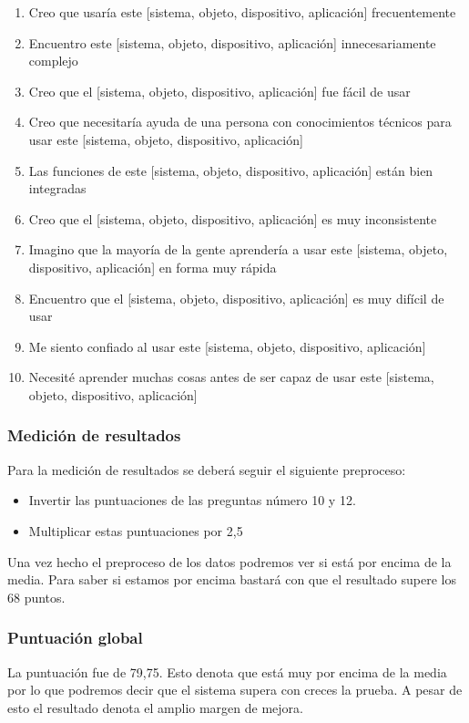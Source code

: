 \begin{enumerate}
  \item Creo que usaría este [sistema, objeto, dispositivo, aplicación] frecuentemente
  \item Encuentro este [sistema, objeto, dispositivo, aplicación] innecesariamente complejo
  \item Creo que el [sistema, objeto, dispositivo, aplicación] fue fácil de usar
  \item Creo que necesitaría ayuda de una persona con conocimientos técnicos para usar este [sistema,
    objeto, dispositivo, aplicación]
  \item Las funciones de este [sistema, objeto, dispositivo, aplicación] están bien integradas
  \item Creo que el [sistema, objeto, dispositivo, aplicación] es muy inconsistente
  \item Imagino que la mayoría de la gente aprendería a usar este [sistema, objeto, dispositivo, aplicación] en forma muy rápida
  \item Encuentro que el [sistema, objeto, dispositivo, aplicación] es muy difícil de usar
  \item Me siento confiado al usar este [sistema, objeto, dispositivo, aplicación]
  \item Necesité aprender muchas cosas antes de ser capaz de usar este [sistema, objeto, dispositivo, aplicación]
\end{enumerate}

\subsubsection{Medición de resultados}

Para la medición de resultados se deberá seguir el siguiente preproceso:
\begin{itemize}
  \item Invertir las puntuaciones de las preguntas número 10 y 12.
  \item Multiplicar estas puntuaciones por 2,5
\end{itemize}

Una vez hecho el preproceso de los datos podremos ver si está por encima
de la media. Para saber si estamos por encima bastará con que el resultado
supere los 68 puntos.

\subsubsection{Puntuación global}
La puntuación fue de 79,75. Esto denota que está muy por encima de la media
por lo que podremos decir que el sistema supera con creces la prueba. A pesar
de esto el resultado denota el amplio margen de mejora.

